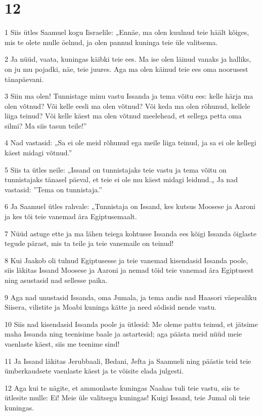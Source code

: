 \chapter{12}

\par 1 Siis ütles Saamuel kogu Iisraelile: „Ennäe, ma olen kuulnud teie häält kõiges, mis te olete mulle öelnud, ja olen pannud kuninga teie üle valitsema.
\par 2 Ja nüüd, vaata, kuningas käibki teie ees. Ma ise olen läinud vanaks ja halliks, on ju mu pojadki, näe, teie juures. Aga ma olen käinud teie ees oma noorusest tänapäevani.
\par 3 Siin ma olen! Tunnistage minu vastu Issanda ja tema võitu ees: kelle härja ma olen võtnud? Või kelle eesli ma olen võtnud? Või keda ma olen rõhunud, kellele liiga teinud? Või kelle käest ma olen võtnud meelehead, et sellega petta oma silmi? Ma siis tasun teile!”
\par 4 Nad vastasid: „Sa ei ole meid rõhunud ega meile liiga teinud, ja sa ei ole kellegi käest midagi võtnud.”
\par 5 Siis ta ütles neile: „Issand on tunnistajaks teie vastu ja tema võitu on tunnistajaks tänasel päeval, et teie ei ole mu käest midagi leidnud.„ Ja nad vastasid: ”Tema on tunnistaja.”
\par 6 Ja Saamuel ütles rahvale: „Tunnistaja on Issand, kes kutsus Moosese ja Aaroni ja kes tõi teie vanemad ära Egiptusemaalt.
\par 7 Nüüd astuge ette ja ma lähen teiega kohtusse Issanda ees kõigi Issanda õiglaste tegude pärast, mis ta teile ja teie vanemaile on teinud!
\par 8 Kui Jaakob oli tulnud Egiptusesse ja teie vanemad kisendasid Issanda poole, siis läkitas Issand Moosese ja Aaroni ja nemad tõid teie vanemad ära Egiptusest ning asustasid nad sellesse paika.
\par 9 Aga nad unustasid Issanda, oma Jumala, ja tema andis nad Haasori väepealiku Siisera, vilistite ja Moabi kuninga kätte ja need sõdisid nende vastu.
\par 10 Siis nad kisendasid Issanda poole ja ütlesid: Me oleme pattu teinud, et jätsime maha Issanda ning teenisime baale ja astartesid; aga päästa meid nüüd meie vaenlaste käest, siis me teenime sind!
\par 11 Ja Issand läkitas Jerubbaali, Bedani, Jefta ja Saamueli ning päästis teid teie ümberkaudsete vaenlaste käest ja te võisite elada julgesti.
\par 12 Aga kui te nägite, et ammonlaste kuningas Naahas tuli teie vastu, siis te ütlesite mulle: Ei! Meie üle valitsegu kuningas! Kuigi Issand, teie Jumal oli teie kuningas.
